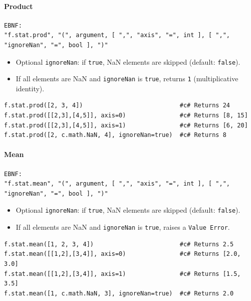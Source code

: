 \paragraph{Product}
\begin{verbatim}
EBNF:
"f.stat.prod", "(", argument, [ ",", "axis", "=", int ], [ ",", "ignoreNan", "=", bool ], ")"
\end{verbatim}
\begin{itemize}
\item Optional \texttt{ignoreNan}: if \texttt{true}, NaN elements are skipped (default: \texttt{false}).
\item If all elements are NaN and \texttt{ignoreNan} is \texttt{true}, returns \texttt{1} (multiplicative identity).
\end{itemize}
\begin{verbatim}
f.stat.prod([2, 3, 4])                           #c# Returns 24
f.stat.prod([[2,3],[4,5]], axis=0)               #c# Returns [8, 15]
f.stat.prod([[2,3],[4,5]], axis=1)               #c# Returns [6, 20]
f.stat.prod([2, c.math.NaN, 4], ignoreNan=true)  #c# Returns 8
\end{verbatim}

\paragraph{Mean}
\begin{verbatim}
EBNF:
"f.stat.mean", "(", argument, [ ",", "axis", "=", int ], [ ",", "ignoreNan", "=", bool ], ")"
\end{verbatim}
\begin{itemize}
\item Optional \texttt{ignoreNan}: if \texttt{true}, NaN elements are skipped (default: \texttt{false}).
\item If all elements are NaN and \texttt{ignoreNan} is \texttt{true}, raises a \texttt{Value Error}.
\end{itemize}
\begin{verbatim}
f.stat.mean([1, 2, 3, 4])                        #c# Returns 2.5
f.stat.mean([[1,2],[3,4]], axis=0)               #c# Returns [2.0, 3.0]
f.stat.mean([[1,2],[3,4]], axis=1)               #c# Returns [1.5, 3.5]
f.stat.mean([1, c.math.NaN, 3], ignoreNan=true)  #c# Returns 2.0
\end{verbatim}

